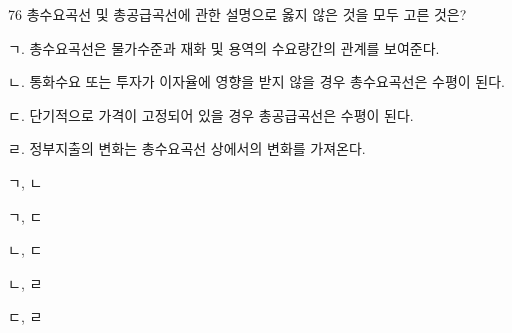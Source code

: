 \begin{question}{76}
총수요곡선 및 총공급곡선에 관한 설명으로 옳지 않은 것을 모두 고른 것은?
\begin{framedtext}
ㄱ. 총수요곡선은 물가수준과 재화 및 용역의 수요량간의 관계를 보여준다. \par
ㄴ. 통화수요 또는 투자가 이자율에 영향을 받지 않을 경우 총수요곡선은 수평이 된다. \par
ㄷ. 단기적으로 가격이 고정되어 있을 경우 총공급곡선은 수평이 된다. \par
ㄹ. 정부지출의 변화는 총수요곡선 상에서의 변화를 가져온다. \par
\end{framedtext}
\begin{choices}
  \item ㄱ, ㄴ
  \item ㄱ, ㄷ
  \item ㄴ, ㄷ
  \item ㄴ, ㄹ
  \item ㄷ, ㄹ
\end{choices}
\end{question}
